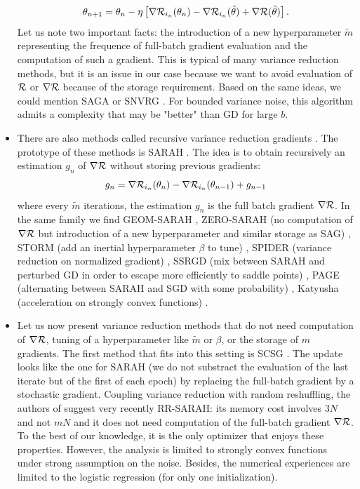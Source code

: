 \begin{itemize}
\begin{equation*}
	\theta_{n+1} = \theta_n -\eta \left[\nabla \mathcal{R}_{i_n}(\theta_n)-\nabla \mathcal{R}_{i_n}(\tilde{\theta})+\nabla \mathcal{R}(\tilde{\theta})\right].
\end{equation*}
Let us note two important facts: the introduction of a new hyperparameter $\tilde{m}$ representing the frequence of full-batch gradient evaluation and the computation of such a
    gradient. This is typical of many variance reduction methods, but it is an issue in our case because we want to avoid evaluation of $\mathcal{R}$ or $\nabla \mathcal{R}$ because of the storage
    requirement. Based on the same ideas, we could mention SAGA \cite{SAGA_first} or SNVRG \cite{SNVRG_first}. For bounded variance noise, this algorithm admits a complexity that
    may be "better" than GD for large $b$. 
\item There are also methods called recursive variance reduction gradients . The prototype of these methods is SARAH \cite{SARAH_first}. The idea is to obtain recursively an estimation $g_n$ of $\nabla \mathcal{R}$ without storing previous gradients:
\begin{equation*}
	g_n = \nabla \mathcal{R}_{i_n}(\theta_n)-\nabla \mathcal{R}_{i_n}(\theta_{n-1})+g_{n-1}
\end{equation*}
where every $\tilde{m}$ iterations, the estimation $g_n$ is the full batch gradient $\nabla \mathcal{R}$. In the same family we find GEOM-SARAH \cite{GEOM_SARAH}, ZERO-SARAH (no computation of $\nabla \mathcal{R}$ but introduction of a new hyperparameter and similar storage as SAG) \cite{ZERO_SARAH}, STORM (add an inertial hyperparameter $\beta$ to tune) \cite{STORM_first}, SPIDER (variance reduction on normalized gradient) \cite{SPIDER_first}, SSRGD (mix between SARAH and perturbed GD in order to escape more efficiently to saddle points) \cite{SSRGD}, PAGE (alternating between SARAH and SGD with some probability) \cite{PAGE}, Katyusha (acceleration on strongly convex functions) \cite{Katyusha}. 
\item Let us now present variance reduction methods that do not need computation of $\nabla \mathcal{R}$, tuning of a hyperparameter like $\tilde{m}$ or $\beta$, or the storage of $m$ gradients. The first method that fits into this setting is SCSG \cite{SCSG}. The update looks like the one for SARAH (we do not substract the evaluation of the last iterate but of the first of each epoch) by replacing the full-batch gradient by a stochastic gradient. Coupling variance reduction with random reshuffling, the authors of \cite{RR_SARAH} suggest very recently RR-SARAH: its memory cost involves $3N$ and not $mN$ and it does not need computation of the full-batch gradient $\nabla \mathcal{R}$. To the best of our knowledge, it is the only optimizer that enjoys these properties. However, the analysis is limited to strongly convex functions under strong assumption on the noise. Besides, the numerical experiences are limited to the logistic regression (for only one initialization). 
\end{itemize}


